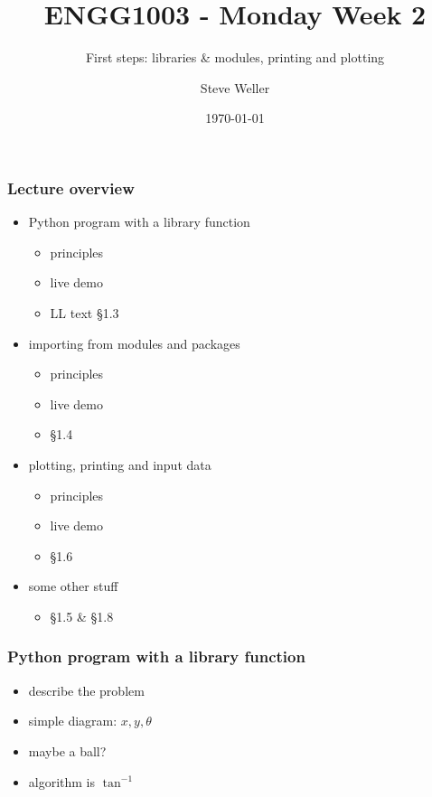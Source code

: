 \documentclass[14pt]{beamer}
\title{ENGG1003 - Monday Week 2}
\subtitle{First steps: libraries \& modules, printing and plotting}
\author{Steve Weller}
\institute{University of Newcastle}
\date{\today}
\newcommand\red[1]{{\color{red} #1}}
\begin{document}
\titlepage


\begin{frame}[fragile]
\frametitle{Lecture overview}
\begin{itemize}
\item Python program with a library function
	\begin{itemize}
		\item principles
		\item live demo
		\item LL text \red{\S1.3}
	\end{itemize}
\item importing from modules and packages
		\begin{itemize}
		\item principles
		\item live demo
		\item \red{\S1.4}
	\end{itemize}
\item plotting, printing and input data
	\begin{itemize}
	\item principles
	\item live demo
	\item \red{\S1.6}
	\end{itemize}
\item some other stuff
	\begin{itemize}
		\item \red{\S1.5} \& \red{\S1.8}
	\end{itemize}
\end{itemize}

\end{frame}


\begin{frame}[fragile]
\frametitle{Python program with a library function}
\begin{itemize}
\item describe the problem
\item simple diagram: $x, y, \theta$
\item maybe a ball?
\item algorithm is $\tan^{-1}$
\end{itemize}
\end{frame}

\end{document}
